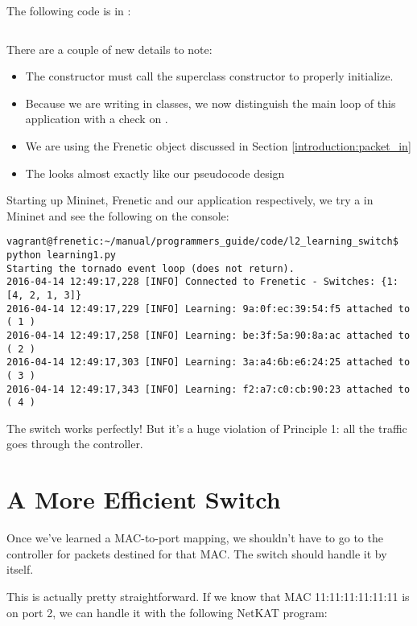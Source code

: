 The following code is in :

\inputminted[linenos]{python}{code/l2_learning_switch/learning1.py}

There are a couple of new details to note:

\begin{itemize}
\item The  constructor must call the superclass constructor to properly initialize.
\item Because we are writing in classes, we now distinguish the main loop of this application with 
a check on .  
\item We are using the Frenetic  object discussed in Section \ref{introduction:packet_in}
\item The  looks almost exactly like our pseudocode design
\end{itemize}

Starting up Mininet, Frenetic and our application respectively, we try a  in Mininet and see
the following on the console:

\begin{verbatim}
vagrant@frenetic:~/manual/programmers_guide/code/l2_learning_switch$ python learning1.py
Starting the tornado event loop (does not return).
2016-04-14 12:49:17,228 [INFO] Connected to Frenetic - Switches: {1: [4, 2, 1, 3]}
2016-04-14 12:49:17,229 [INFO] Learning: 9a:0f:ec:39:54:f5 attached to ( 1 )
2016-04-14 12:49:17,258 [INFO] Learning: be:3f:5a:90:8a:ac attached to ( 2 )
2016-04-14 12:49:17,303 [INFO] Learning: 3a:a4:6b:e6:24:25 attached to ( 3 )
2016-04-14 12:49:17,343 [INFO] Learning: f2:a7:c0:cb:90:23 attached to ( 4 )
\end{verbatim}

The switch works perfectly!  But it's a huge violation of Principle 1: all the traffic 
goes through the controller.  

\section{A More Efficient Switch}

Once we've learned a MAC-to-port
mapping, we shouldn't have to go to the controller for packets destined for that MAC.  The switch
should handle it by itself.

This is actually pretty straightforward.  If we know that MAC 11:11:11:11:11:11 is on port 2, we
can handle it with the following NetKAT program:

